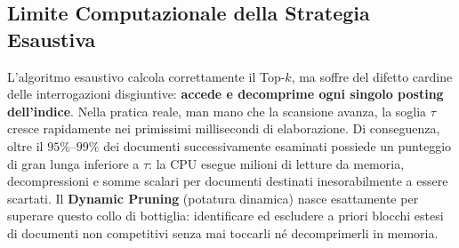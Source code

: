\begin{table}[H]
\centering
\small
{}
\caption{Tracciamento della scansione esaustiva DAAT con Min-Heap per i primi 5 documenti candidati.}
\label{tab:daat-esaustivo-traccia}
\end{table}

\FloatBarrier
\subsection{Limite Computazionale della Strategia Esaustiva}
L'algoritmo esaustivo calcola correttamente il Top-$k$, ma soffre del difetto cardine delle interrogazioni disgiuntive: \textbf{accede e decomprime ogni singolo posting dell'indice}.  
Nella pratica reale, man mano che la scansione avanza, la soglia $\tau$ cresce rapidamente nei primissimi millisecondi di elaborazione. Di conseguenza, oltre il $95\%\text{--}99\%$ dei documenti successivamente esaminati possiede un punteggio di gran lunga inferiore a $\tau$: la CPU esegue milioni di letture da memoria, decompressioni e somme scalari per documenti destinati inesorabilmente a essere scartati.  
Il \textbf{Dynamic Pruning} (potatura dinamica) nasce esattamente per superare questo collo di bottiglia: identificare ed escludere a priori blocchi estesi di documenti non competitivi senza mai toccarli n\'e decomprimerli in memoria.

